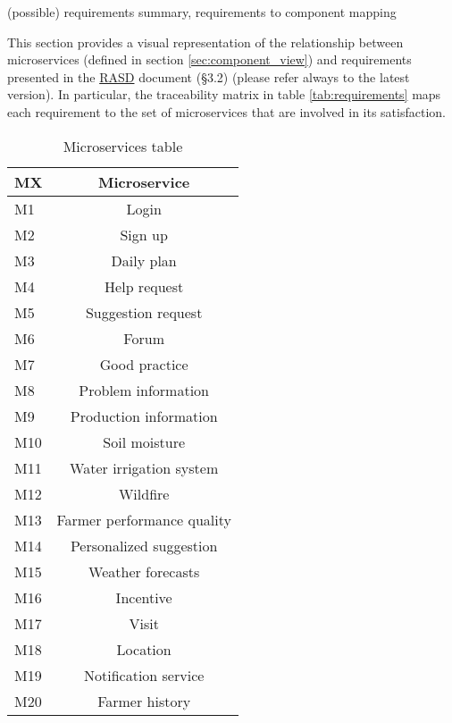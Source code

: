 (possible) requirements summary, requirements to component mapping

This section provides a visual representation of the relationship between microservices (defined in section \ref{sec:component_view}) and requirements presented in the \href{https://github.com/MarcoRomanini/GoriRomaniniWatanabe/tree/main/DeliveryFolder}{RASD} document (\S 3.2) (please refer always to the latest version). In particular, the traceability matrix in table \ref{tab:requirements} maps each requirement to the set of microservices that are involved in its satisfaction.

\begin{table}[H]
    \setlength\arrayrulewidth{1pt}
    \centering
    \begin{tabular}{|l|c|}
        \rowcolor{myblue}
        \hline
        \color{white}MX & \color{white}Microservice\\
        \hline
        M1      &   Login\\
        \hline
        M2      &   Sign up\\
        \hline
        M3      &   Daily plan\\
        \hline
        M4      &   Help request\\
        \hline
        M5      &   Suggestion request\\
        \hline
        M6      &   Forum\\
        \hline
        M7      &   Good practice\\
        \hline
        M8      &   Problem information\\
        \hline
        M9      &   Production information\\
        \hline
        M10      &   Soil moisture\\
        \hline
        M11      &   Water irrigation system\\
        \hline
        M12      &   Wildfire\\
        \hline
        M13      &   Farmer performance quality\\
        \hline
        M14      &   Personalized suggestion\\
        \hline
        M15      &   Weather forecasts\\
        \hline
        M16      &   Incentive\\
        \hline
        M17     & Visit \\
        \hline
        M18     & Location\\
        \hline
        M19     & Notification service\\
        \hline
        M20     & Farmer history\\
        \hline
    \end{tabular}
    
    \caption{\label{tab:microservices_table}Microservices table}
    
\end{table}


